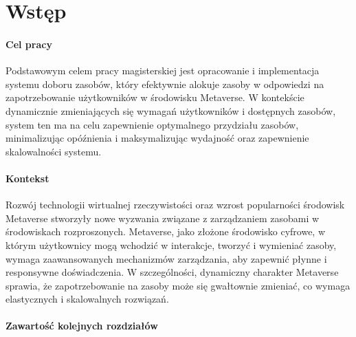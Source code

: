 \chapter{Wstęp}

\subsubsection{Cel pracy}

Podstawowym celem pracy magisterskiej jest opracowanie i implementacja systemu doboru zasobów, który efektywnie alokuje zasoby w odpowiedzi na zapotrzebowanie użytkowników w środowisku Metaverse. W kontekście dynamicznie zmieniających się wymagań użytkowników i dostępnych zasobów, system ten ma na celu zapewnienie optymalnego przydziału zasobów, minimalizując opóźnienia i maksymalizując wydajność oraz zapewnienie skalowalności systemu.

\subsubsection{Kontekst}

Rozwój technologii wirtualnej rzeczywistości oraz wzrost popularności środowisk Metaverse stworzyły nowe wyzwania związane z zarządzaniem zasobami w środowiskach rozproszonych. Metaverse, jako złożone środowisko cyfrowe, w którym użytkownicy mogą wchodzić w interakcje, tworzyć i wymieniać zasoby, wymaga zaawansowanych mechanizmów zarządzania, aby zapewnić płynne i responsywne doświadczenia. W szczególności, dynamiczny charakter Metaverse sprawia, że zapotrzebowanie na zasoby może się gwałtownie zmieniać, co wymaga elastycznych i skalowalnych rozwiązań.


\subsubsection{Zawartość kolejnych rozdziałów}
